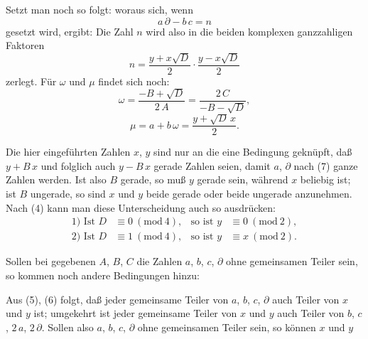 Setzt man noch
so folgt:
woraus sich, wenn
\[
a\,\partial - b\,c = n
\]
gesetzt wird, ergibt:
Die Zahl $n$ wird also in die beiden komplexen ganzzahligen Faktoren
\[
n = \frac{y+x\sqrt{D}}{2}\cdot\frac{y-x\sqrt{D}}{2}
\]
zerlegt. Für $\omega$ und $\mu$ findet sich noch:
\[
\omega = \frac{-B+\sqrt{D}}{2\,A} = \frac{2\,C}{-B-\sqrt{D}},
\]
\[
\mu = a+b\,\omega = \frac{y+\sqrt{D}\,x}{2}.
\]

Die hier eingeführten Zahlen $x$, $y$ sind nur an die eine Bedingung
geknüpft, daß $y+B\,x$ und folglich auch $y-B\,x$ gerade Zahlen seien,
damit $a$, $\partial$ nach (7) ganze Zahlen werden. Ist also $B$
gerade, so muß $y$ gerade sein, während $x$ beliebig ist; ist $B$
ungerade, so sind $x$ und $y$ beide gerade oder beide ungerade
anzunehmen. Nach (4) kann man diese Unterscheidung auch so ausdrücken:
\[
\begin{aligned}
\text{1) Ist }D&\equiv0\ (\mathrm{mod}\ 4), &\text{so ist }y&\equiv0\ (\mathrm{mod}\ 2),\\
\text{2) Ist }D&\equiv1\ (\mathrm{mod}\ 4), &\text{so ist }y&\equiv x\ (\mathrm{mod}\ 2).
\end{aligned}
\]

Sollen bei gegebenen $A$, $B$, $C$ die Zahlen $a$, $b$, $c$, $\partial$
ohne gemeinsamen Teiler sein, so kommen noch andere Bedingungen hinzu:

Aus (5), (6) folgt, daß jeder gemeinsame Teiler von $a$, $b$, $c$,
$\partial$ auch Teiler von $x$ und $y$ ist; umgekehrt ist jeder
gemeinsame Teiler von $x$ und $y$ auch Teiler von $b$, $c$, $2\,a$,
$2\,\partial$. Sollen also $a$, $b$, $c$, $\partial$ ohne gemeinsamen
Teiler sein, so können $x$ und $y$
